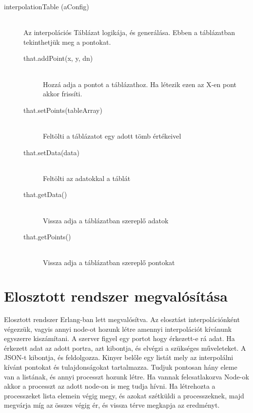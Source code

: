 \begin{description}
		\item[interpolationTable (aConfig)]
			\hfill \\ 
				Az interpolációs Táblázat logikája, és generálása. Ebben a táblázatban tekinthetjük meg a pontokat.
			\begin{description}
			\item[that.addPoint(x, y, dn)] 
			\hfill \\ Hozzá adja a pontot a táblázathoz. Ha létezik ezen az X-en pont akkor frissíti.
			\item[that.setPoints(tableArray)] 
			\hfill \\ Feltölti a táblázatot egy adott tömb értékeivel
			\item[that.setData(data)] 
			\hfill \\ Feltölti az adatokkal a táblát
			\item[that.getData()] 
			\hfill \\ Vissza adja a táblázatban szereplő adatok
			\item[that.getPoints()] 
			\hfill \\ Vissza adja a táblázatban szereplő pontokat
			\end{description}
	\end{description}



\section{Elosztott rendszer  megvalósítása}
Elosztott rendszer Erlang-ban lett megvalósítva. Az elosztást interpolációnként végezzük, vagyis annyi node-ot hozunk létre amennyi interpolációt kívánunk egyszerre kiszámítani. \newline
A szerver figyel egy portot hogy érkezett-e rá adat. Ha érkezett adat az adott portra, azt kibontja, és elvégzi a szükséges műveleteket. A JSON-t kibontja, és feldolgozza. Kinyer belőle egy listát mely az interpolálni kívánt pontokat és tulajdonságokat tartalmazza. \newline
Tudjuk pontosan hány eleme van a listának, és annyi processzt hozunk létre. Ha vannak felcsatlakozva Node-ok akkor a processzt az adott node-on is meg tudja hívni.
Ha létrehozta a processzeket lista elemein végig megy, és azokat szétküldi a processzeknek, majd megvárja míg az összes végig ér, és vissza térve megkapja az eredményt.
